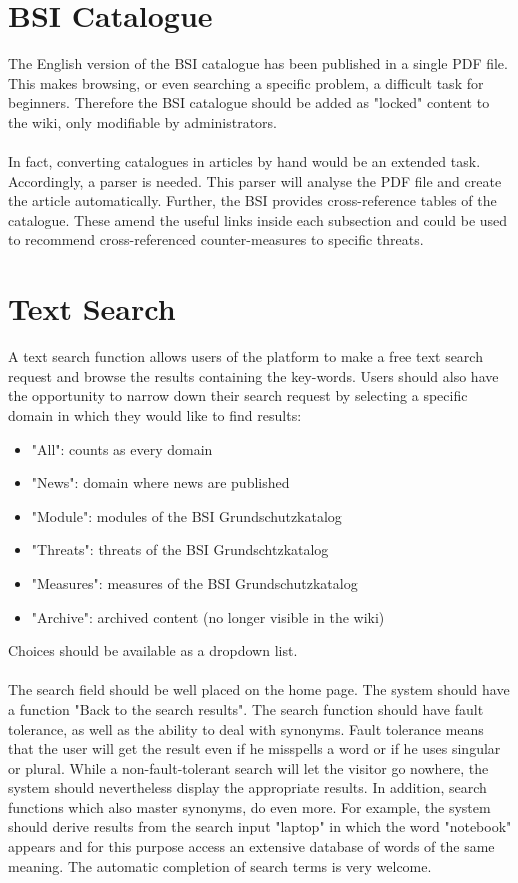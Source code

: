 \section{BSI Catalogue}
The English version of the BSI catalogue has been published in a single PDF file. 
This makes browsing, or even searching a specific problem, a difficult task for beginners. 
Therefore the BSI catalogue should be added as "locked" content to the wiki, only modifiable by administrators.
\\\\
In fact, converting catalogues in articles by hand would be an extended task. 
Accordingly, a parser is needed. 
This parser will analyse the PDF file and create the article automatically. 
Further, the BSI provides cross-reference tables of the catalogue. 
These amend the useful links inside each subsection and could be used to recommend cross-referenced counter-measures to specific threats.


\section{Text Search}
\label{search_function}
A text search function allows users of the platform to make a free text search request and browse the results containing the key-words. 
Users should also have the opportunity to narrow down their search request by selecting a specific domain in which they would like to find results:
\begin{itemize}
\item "All": counts as every domain
\item "News": domain where news are published
\item "Module": modules of the BSI Grundschutzkatalog
\item "Threats": threats of the BSI Grundschtzkatalog
\item "Measures": measures of the BSI Grundschutzkatalog
\item "Archive": archived content (no longer visible in the wiki)
\end{itemize}
 
Choices should be available as a dropdown list.
\\\\
The search field should be well placed on the home page. 
The system should have a function "Back to the search results". 
The search function should have fault tolerance, as well as the ability to deal with synonyms. 
Fault tolerance means that the user will get the result even if he misspells a word or if he uses singular or plural. 
While a non-fault-tolerant search will let the visitor go nowhere, the system should nevertheless display the appropriate results.
In addition, search functions which also master synonyms, do even more. 
For example, the system should derive results from the search input "laptop" in which the word "notebook" appears and for this purpose access an extensive database of words of the same meaning. 
The automatic completion of search terms is very welcome.
 

